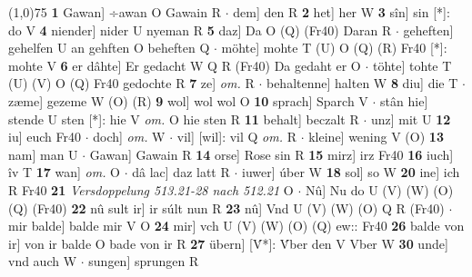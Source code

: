 \documentclass[8pt,a4paper,notitlepage]{article}
\begin{document}
\begin{table}[ht]
\begin{minipage}[t]{0.5\linewidth}
\line(1,0){75} \newline
\textbf{1} Gawan] ÷awan O Gawain R  $\cdot$ dem] den R \textbf{2} het] her W \textbf{3} sîn] sin [*]: do V \textbf{4} niender] nider U nyeman R \textbf{5} daz] Da O (Q) (Fr40) Daran R  $\cdot$ geheften] gehelfen U an gehften O beheften Q  $\cdot$ möhte] mohte T (U) O (Q) (R) Fr40 [*]: mohte V \textbf{6} er dâhte] Er gedacht W Q R (Fr40) Da gedaht er O  $\cdot$ töhte] tohte T (U) (V) O (Q) Fr40 gedochte R \textbf{7} ze] \textit{om.} R  $\cdot$ behaltenne] halten W \textbf{8} diu] die T  $\cdot$ zæme] gezeme W (O) (R) \textbf{9} wol] wol wol O \textbf{10} sprach] Sparch V  $\cdot$ stân hie] stende U sten [*]: hie V \textit{om.} O hie sten R \textbf{11} behalt] beczalt R  $\cdot$ unz] mit U \textbf{12} iu] euch Fr40  $\cdot$ doch] \textit{om.} W  $\cdot$ vil] [wil]: vil Q \textit{om.} R  $\cdot$ kleine] wening V (O) \textbf{13} nam] man U  $\cdot$ Gawan] Gawain R \textbf{14} orse] Rose sin R \textbf{15} mirz] irz Fr40 \textbf{16} iuch] îv T \textbf{17} wan] \textit{om.} O  $\cdot$ dâ lac] daz latt R  $\cdot$ iuwer] úber W \textbf{18} sol] so W \textbf{20} ine] ich R Fr40 \textbf{21} \textit{Versdoppelung 513.21-28 nach 512.21} O   $\cdot$ Nû] Nu do U (V) (W) (O) (Q) (Fr40) \textbf{22} nû sult ir] ir súlt nun R \textbf{23} nû] Vnd U (V) (W) (O) Q R (Fr40)  $\cdot$ mir balde] balde mir V O \textbf{24} mir] vch U (V) (W) (O) (Q) ew:: Fr40 \textbf{26} balde von ir] von ir balde O bade von ir R \textbf{27} übern] [V́*]: V́ber den V Vber W \textbf{30} unde] vnd auch W  $\cdot$ sungen] sprungen R \newline
\end{minipage}
\end{table}
\end{document}
